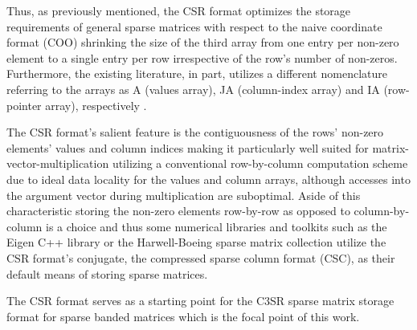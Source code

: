     Thus, as previously mentioned, the CSR format optimizes the storage requirements of general sparse matrices with
    respect to the naive coordinate format (COO) shrinking the size of the third array from one entry per non-zero
    element to a single entry per row irrespective of the row's number of non-zeros. Furthermore, the existing
    literature, in part, utilizes a different nomenclature referring to the arrays as A (values array), JA (column-index
    array) and IA (row-pointer array), respectively \cite{sparskit}.

    The CSR format's salient feature is the contiguousness of the rows' non-zero elements' values and column indices
    making it particularly well suited for matrix-vector-multiplication utilizing a conventional row-by-column
    computation scheme due to ideal data locality for the values and column arrays, although accesses into the argument
    vector during multiplication are suboptimal. Aside of this characteristic storing the non-zero elements row-by-row
    as opposed to column-by-column is a choice and thus some numerical libraries and toolkits such as the Eigen C++
    library \cite{eigen:website} or the Harwell-Boeing sparse matrix collection \cite{harwell-boeing} utilize the
    CSR format's conjugate, the compressed sparse column format (CSC), as their default means of storing sparse
    matrices.

    The CSR format serves as a starting point for the C3SR sparse matrix storage format for sparse banded matrices which
    is the focal point of this work.

